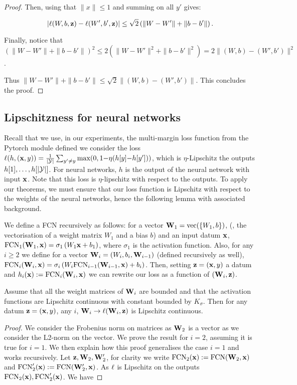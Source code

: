 \begin{noaddcontents}
\begin{proof}
        Then, using that $\|x\| \leq 1$ and summing on all $y'$ gives: 
    
        \[|\ell(W,b,\mathbf{z})- \ell(W',b',\mathbf{z})| \leq \sqrt{2}\left(\|W-W'\| + \|b-b'\|\right). \]
    
        Finally, notice that $(\|W-W'\| + \|b-b'\|)^2 \leq 2(\|W-W'\|^2 + \|b-b'\|^2) = 2\|(W,b)-(W',b')\|^2$. 
    
        Thus $\|W-W'\| + \|b-b'\| \leq \sqrt{2}\|(W,b)-(W',b')\|$. 
        This concludes the proof.
    \end{proof}
    
    \subsection{Lipschitzness for neural networks}
    \label{sec:lip-nn}
    
    Recall that we use, in our experiments, the multi-margin loss function from the Pytorch module defined we consider the loss $\ell(h, (\mathbf{x}, y)) = \frac{1}{|\mathcal{Y}|}\sum_{y'\ne y} \max(0, 1{-} \eta(h[y]{-}h[y']))$, which is $\eta$-Lipschitz \wrt the outputs $h[1],\dots, h[|\mathcal{Y}|]$.
    For neural networks, $h$ is the output of the neural network with input $\mathbf{x}$. Note that this loss is $\eta$-lipschitz with respect to the outputs.
    To apply our theorems, we must ensure that our loss function is Lipschitz with respect to the weights of the neural networks, hence the following lemma with associated background.
    
    We define a FCN recursively as follows: for a vector $\mathbf{W}_1= \operatorname*{\mathrm{vec}}(\{W_1,b\})$, (\ie, the vectorisation of a weight matrix $W_1$ and a bias $b$) and an input datum $\mathbf{x}$, $\text{FCN}_1(\mathbf{W}_1, \mathbf{x})= \sigma_1\left(W_1\mathbf{x} +b_1  \right)$, where $\sigma_1$ is the activation function.
    Also, for any $i\geq 2$ we define for a vector $\mathbf{W}_i= (W_{i},b_i,\mathbf{W}_{i-1})$ (defined recursively as well), $\text{FCN}_i(\mathbf{W}_{i},\mathbf{x})= \sigma_i\left(W_i\text{FCN}_{i-1}(\mathbf{W}_{i-1},\mathbf{x}) +b_i  \right)$.
    Then, setting $\mathbf{z}=(\mathbf{x},y)$ a datum and  $h_i(\mathbf{x}) := \text{FCN}_i(\mathbf{W}_{i},\mathbf{x})$ we can rewrite our loss as a function of $(\mathbf{W}_{i},\mathbf{z})$. 
    
    \begin{lemma}
        \label{l:lip-nn}
        Assume that all the weight matrices of $\mathbf{W}_i$ are bounded and that the activation functions are Lipschitz continuous with constant bounded by $K_\sigma$.
        Then for any datum $\mathbf{z}= (\mathbf{x},y)$, any $i$, $\mathbf{W}_i\rightarrow\ell(\mathbf{W}_i,\mathbf{z})$ is Lipschitz continuous.
    \end{lemma}
    \begin{proof}
        We consider the Frobenius norm on matrices as $\mathbf{W}_2$ is a vector as we consider the L2-norm on the vector.
        We prove the result for $i=2$, assuming it is true for $i=1$. We then explain how this proof generalises the case $i=1$ and works recursively.
        Let $\mathbf{z},\mathbf{W}_2,\mathbf{W}_2'$, for clarity we write $\text{FCN}_2(\mathbf{x}):= \text{FCN}(\mathbf{W}_2,\mathbf{x})$ and $\text{FCN}_2'(\mathbf{x}):= \text{FCN}(\mathbf{W}_2',\mathbf{x})$. 
        As $\ell$ is Lipschitz on the outputs $\text{FCN}_2(\mathbf{x}), \text{FCN}_2'(\mathbf{x})$. 
        We have
        

\end{proof}
\end{noaddcontents}
